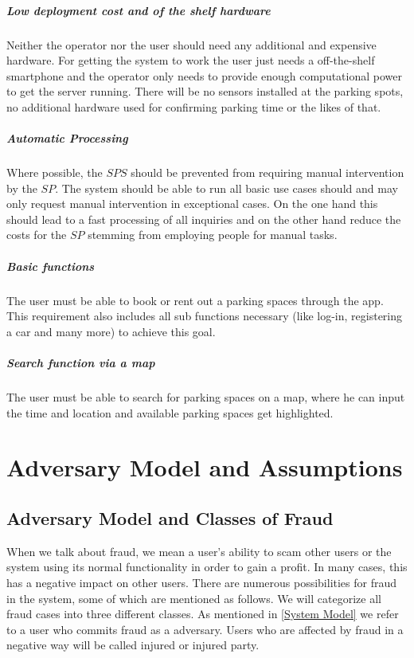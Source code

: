 \subparagraph{Low deployment cost and of the shelf hardware} Neither the operator nor the user should need any additional and expensive hardware. For getting the system to work the user just needs a off-the-shelf smartphone and the operator only needs to provide enough computational power to get the server running. There will be no sensors installed at the parking spots, no additional hardware used for confirming parking time or the likes of that.
\subparagraph{Automatic Processing} Where possible, the $SPS$ should be prevented from requiring manual intervention by the $SP$. The system should be able to run all basic use cases should and may only request manual intervention in exceptional cases. On the one hand this should lead to a fast processing of all inquiries and on the other hand reduce the costs for the $SP$ stemming from employing people for manual tasks.

\subparagraph{Basic functions} The user must be able to book or rent out a parking spaces through the app. This requirement also includes all sub functions necessary (like log-in, registering a car and many more) to achieve this goal.

\subparagraph{Search function via a map} The user must be able to search for parking spaces on a map, where he can input the time and location and available parking spaces get highlighted. 

\section{Adversary Model and Assumptions}\label{sec:Adversary Model and Assumptions}

\subsection{Adversary Model and Classes of Fraud}
When we talk about fraud, we mean a user's ability to scam other users or the system using its normal functionality in order to gain a profit. In many cases, this has a negative impact on other users. There are numerous possibilities for fraud in the system, some of which are mentioned as follows. We will categorize all fraud cases into three different classes. As mentioned in \ref{System Model} we refer to a user who commits fraud as a adversary. Users who are affected by fraud in a negative way will be called injured or injured party. \\

